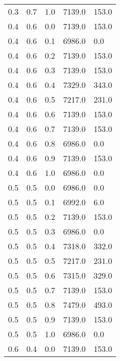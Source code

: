 \begin{longtable}{ l | l | l | l | l}
        0.3&          0.7&          1.0&       7139.0&        153.0\\
        0.4&          0.6&          0.0&       7139.0&        153.0\\
        0.4&          0.6&          0.1&       6986.0&          0.0\\
        0.4&          0.6&          0.2&       7139.0&        153.0\\
        0.4&          0.6&          0.3&       7139.0&        153.0\\
        0.4&          0.6&          0.4&       7329.0&        343.0\\
        0.4&          0.6&          0.5&       7217.0&        231.0\\
        0.4&          0.6&          0.6&       7139.0&        153.0\\
        0.4&          0.6&          0.7&       7139.0&        153.0\\
        0.4&          0.6&          0.8&       6986.0&          0.0\\
        0.4&          0.6&          0.9&       7139.0&        153.0\\
        0.4&          0.6&          1.0&       6986.0&          0.0\\
        0.5&          0.5&          0.0&       6986.0&          0.0\\
        0.5&          0.5&          0.1&       6992.0&          6.0\\
        0.5&          0.5&          0.2&       7139.0&        153.0\\
        0.5&          0.5&          0.3&       6986.0&          0.0\\
        0.5&          0.5&          0.4&       7318.0&        332.0\\
        0.5&          0.5&          0.5&       7217.0&        231.0\\
        0.5&          0.5&          0.6&       7315.0&        329.0\\
        0.5&          0.5&          0.7&       7139.0&        153.0\\
        0.5&          0.5&          0.8&       7479.0&        493.0\\
        0.5&          0.5&          0.9&       7139.0&        153.0\\
        0.5&          0.5&          1.0&       6986.0&          0.0\\
        0.6&          0.4&          0.0&       7139.0&        153.0\\

\end{longtable}
